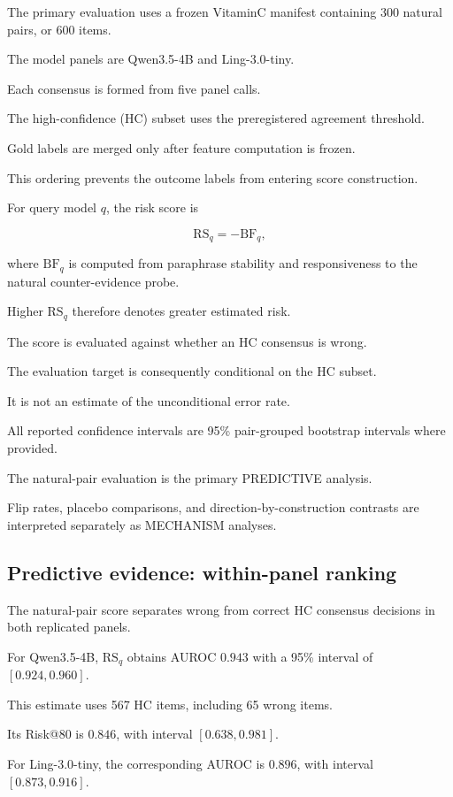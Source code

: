 \documentclass[11pt]{article}
\begin{document}
The primary evaluation uses a frozen VitaminC manifest containing 300 natural pairs, or 600 items.

The model panels are Qwen3.5-4B and Ling-3.0-tiny.

Each consensus is formed from five panel calls.

The high-confidence (HC) subset uses the preregistered agreement threshold.

Gold labels are merged only after feature computation is frozen.

This ordering prevents the outcome labels from entering score construction.

For query model \(q\), the risk score is

\[
\mathrm{RS}_q=-\mathrm{BF}_q,
\]

where \(\mathrm{BF}_q\) is computed from paraphrase stability and responsiveness to the natural counter-evidence probe.

Higher \(\mathrm{RS}_q\) therefore denotes greater estimated risk.

The score is evaluated against whether an HC consensus is wrong.

The evaluation target is consequently conditional on the HC subset.

It is not an estimate of the unconditional error rate.

All reported confidence intervals are 95\% pair-grouped bootstrap intervals where provided.

The natural-pair evaluation is the primary PREDICTIVE analysis.

Flip rates, placebo comparisons, and direction-by-construction contrasts are interpreted separately as MECHANISM analyses.

\subsection{Predictive evidence: within-panel ranking}

The natural-pair score separates wrong from correct HC consensus decisions in both replicated panels.

For Qwen3.5-4B, \(\mathrm{RS}_q\) obtains AUROC \(0.943\) with a 95\% interval of \([0.924,0.960]\).

This estimate uses 567 HC items, including 65 wrong items.

Its Risk@80 is \(0.846\), with interval \([0.638,0.981]\).

For Ling-3.0-tiny, the corresponding AUROC is \(0.896\), with interval \([0.873,0.916]\).
\end{document}
